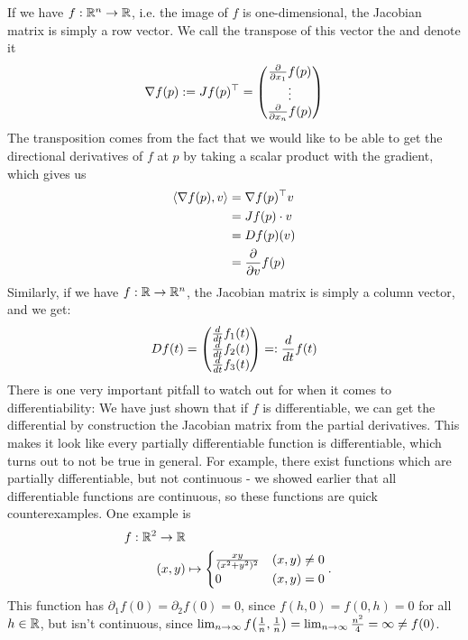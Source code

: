If we have $f : \mathbb{R}^n \to \mathbb{R}$, i.e. the image of $f$ is one-dimensional, the Jacobian matrix is simply a row vector. We call the transpose of this vector the  and denote it
\begin{align*}
	\nabla f(p)
	:=
	Jf(p)^\top
	=
	\begin{pmatrix}
		\pderivative{x_1} f(p)\\
		\vdots\\
		\pderivative{x_n} f(p)
	\end{pmatrix}
\end{align*}
The transposition comes from the fact that we would like to be able to get the directional derivatives of $f$ at $p$ by taking a scalar product with the gradient, which gives us
\begin{align*}
	\scalar{\nabla f(p)}{v} 
	&= \nabla f(p)^\top v\\ 
	&= Jf(p) \cdot v\\ 
	&= Df(p)(v)\\
	&= \pderivative{v} f(p)
\end{align*}
Similarly, if we have $f : \mathbb{R} \to \mathbb{R}^n$, the Jacobian matrix is simply a column vector, and we get:
\begin{align*}
	Df(t) = \begin{pmatrix} \frac{d}{dt} f_1(t)\\\frac{d}{dt} f_2(t)\\\frac{d}{dt} f_3(t)\end{pmatrix} =: \frac{d}{dt} f(t)
\end{align*}
\newpar
There is one very important pitfall to watch out for when it comes to differentiability: We have just shown that if $f$ is differentiable, we can get the differential by construction the Jacobian matrix from the partial derivatives. This makes it look like every partially differentiable function is differentiable, which turns out to not be true in general. 
\newpar
For example, there exist functions which are partially differentiable, but not continuous - we showed earlier that all differentiable functions are continuous, so these functions are quick counterexamples.
\newpar
One example is
\begin{align*}
	f : \mathbb{R}^2 \to \mathbb{R}\\
	(x,y) &\mapsto
	\begin{cases}
		\frac{xy}{(x^2 + y^2)^2} & (x,y) \neq 0\\
		0 & (x,y) = 0
	\end{cases}.
\end{align*}
This function has $\partial_1 f(0) = \partial_2 f(0) = 0$, since $f(h,0) = f(0,h) = 0$ for all $h \in \mathbb{R}$, but isn't continuous, since $\lim_{n \to \infty} f\qty(\frac{1}{n}, \frac{1}{n}) = \lim_{n \to \infty} \frac{n^2}{4} = \infty \neq f(0)$.
